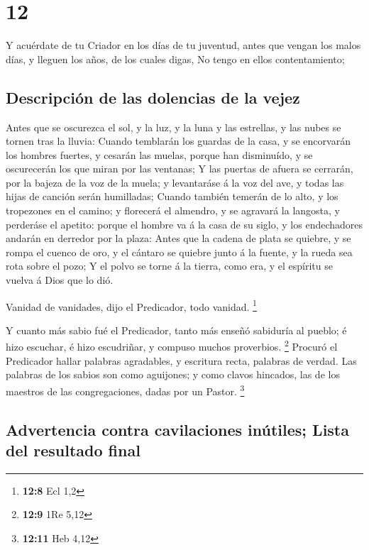 \hypertarget{section-11}{%
\section{12}\label{section-11}}

 Y acuérdate de tu Criador en los días de tu juventud,
antes que vengan los malos días, y lleguen los años, de los cuales
digas, No tengo en ellos contentamiento;

\hypertarget{descripciuxf3n-de-las-dolencias-de-la-vejez}{%
\subsection{Descripción de las dolencias de la
vejez}\label{descripciuxf3n-de-las-dolencias-de-la-vejez}}

 Antes que se oscurezca el sol, y la luz, y la luna y las
estrellas, y las nubes se tornen tras la lluvia:  Cuando
temblarán los guardas de la casa, y se encorvarán los hombres fuertes, y
cesarán las muelas, porque han disminuído, y se oscurecerán los que
miran por las ventanas;  Y las puertas de afuera se
cerrarán, por la bajeza de la voz de la muela; y levantaráse á la voz
del ave, y todas las hijas de canción serán humilladas; 
Cuando también temerán de lo alto, y los tropezones en el camino; y
florecerá el almendro, y se agravará la langosta, y perderáse el
apetito: porque el hombre va á la casa de su siglo, y los endechadores
andarán en derredor por la plaza:  Antes que la cadena de
plata se quiebre, y se rompa el cuenco de oro, y el cántaro se quiebre
junto á la fuente, y la rueda sea rota sobre el pozo;  Y
el polvo se torne á la tierra, como era, y el espíritu se vuelva á Dios
que lo dió.

 Vanidad de vanidades, dijo el Predicador, todo vanidad.
\footnote{\textbf{12:8} Ecl 1,2}

 Y cuanto más sabio fué el Predicador, tanto más enseñó
sabiduría al pueblo; é hizo escuchar, é hizo escudriñar, y compuso
muchos proverbios. \footnote{\textbf{12:9} 1Re 5,12} 
Procuró el Predicador hallar palabras agradables, y escritura recta,
palabras de verdad.  Las palabras de los sabios son como
aguijones; y como clavos hincados, las de los maestros de las
congregaciones, dadas por un Pastor. \footnote{\textbf{12:11} Heb 4,12}

\hypertarget{advertencia-contra-cavilaciones-inuxfatiles-lista-del-resultado-final}{%
\subsection{Advertencia contra cavilaciones inútiles; Lista del
resultado
final}\label{advertencia-contra-cavilaciones-inuxfatiles-lista-del-resultado-final}}

